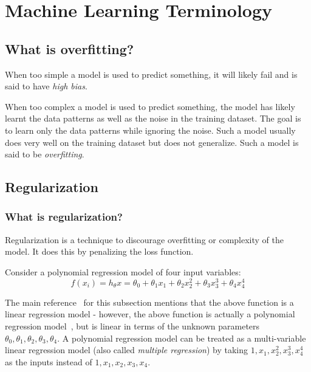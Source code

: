 \pagestyle{plain}
\section{Machine Learning Terminology}
\subsection[What is overfitting?]{What is overfitting?\cite{l1l2regularization}}
\label{sec:what_is_overfitting}
When too simple a model is used to predict something, it will likely fail and is said to have \emph{high bias}.

When too complex a model is used to predict something, the model has likely learnt the data patterns as well as the noise in the training dataset. The goal is to learn only the data patterns while ignoring the noise. Such a model usually does very well on the training dataset but does not generalize. Such a model is said to be \emph{overfitting}.

\subsection{Regularization}
\subsubsection[What is regularization?]{What is regularization?\cite{l1l2regularization}}
\label{sec:what_is_regularization}
Regularization is a technique to discourage overfitting or complexity of the model. It does this by penalizing the loss function.

Consider a polynomial regression model of four input variables:
\begin{equation}
f(x_i) = h_{\theta}x = \theta_0 + \theta_1 x_1 + \theta_2 x_2^2 + \theta_3 x_3^3 + \theta_4 x_4^4
\end{equation}

The main reference~\cite{l1l2regularization} for this subsection mentions that the above function is a linear regression model - however, the above function is actually a polynomial regression model~\cite{WikiPolynomialRegression}, but is linear in terms of the unknown parameters $\theta_0, \theta_1, \theta_2, \theta_3, \theta_4$. A polynomial regression model can be treated as a multi-variable linear regression model (also called \emph{multiple regression}) by taking $1, x_1,x_2^2,x_3^3,x_4^4$ as the inputs instead of $1,x_1,x_2,x_3,x_4$.

